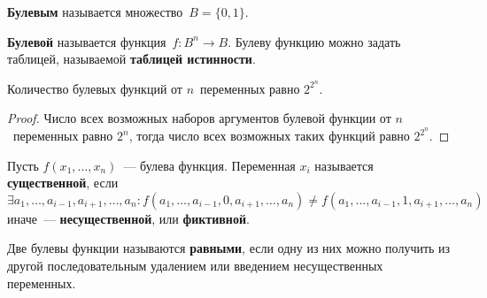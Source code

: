  \textbf{Булевым} называется множество~$B = \{ 0, 1 \}$.

 \textbf{Булевой} называется функция~$f \colon B^n \to B$.
Булеву функцию можно задать таблицей, называемой \textbf{таблицей истинности}.

\begin{statement}
Количество булевых функций от $n$~переменных равно $2^{2^n}$.
\end{statement}
\begin{proof}
Число всех возможных наборов аргументов булевой функции от $n$~переменных равно $2^n$, тогда число всех возможных таких функций равно $2^{2^n}$.
\end{proof}

  Пусть $f(x_1, \ldots, x_n)$~--- булева функция.
Переменная $x_i$ называется \textbf{существенной}, если
\begin{equation*}
\exists a_1, \ldots, a_{i-1}, a_{i+1}, \ldots, a_n \colon
f(a_1, \ldots, a_{i-1}, 0, a_{i+1}, \ldots, a_n) \neq f(a_1, \ldots, a_{i-1}, 1, a_{i+1}, \ldots, a_n)
\end{equation*}
иначе~--- \textbf{несущественной}, или \textbf{фиктивной}.

Две булевы функции называются \textbf{равными}, если одну из них можно получить из другой последовательным удалением или введением несущественных переменных.